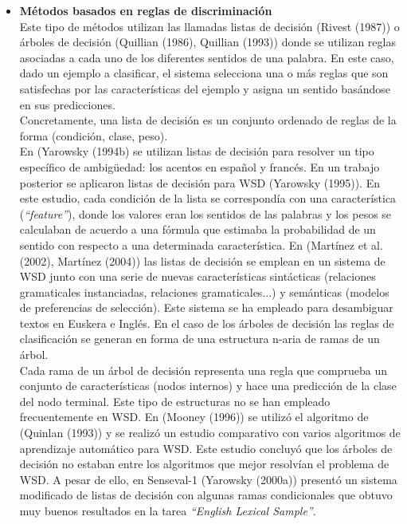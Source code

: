 \begin{itemize}
  \item \textbf{Métodos basados en reglas de discriminación} \\
  Este tipo de métodos utilizan las llamadas listas de decisión (Rivest (1987)) o árboles de decisión (Quillian (1986), Quillian (1993)) donde se utilizan reglas asociadas a cada uno de los diferentes sentidos de una palabra. En este caso, dado un ejemplo a clasificar, el sistema selecciona una o más reglas que son satisfechas por las características del ejemplo y asigna un sentido basándose en sus predicciones.\\
  Concretamente, una lista de decisión es un conjunto ordenado de reglas de la forma (condición, clase, peso).\\
  En (Yarowsky (1994b) se utilizan listas de decisión para resolver un tipo específico de ambigüedad: los acentos en español y francés. En un trabajo posterior se aplicaron listas de decisión para WSD (Yarowsky (1995)). En este estudio, cada condición de la lista se correspondía con una característica (\textit{“feature”}), donde los valores eran los sentidos de las palabras y los pesos se calculaban de acuerdo a una fórmula que estimaba la probabilidad de un sentido con respecto a una determinada característica. En (Martínez et al. (2002), Martínez (2004)) las listas de decisión se emplean en un sistema de WSD junto con una serie de nuevas características sintácticas (relaciones gramaticales instanciadas, relaciones gramaticales...) y semánticas (modelos de preferencias de selección). Este sistema se ha empleado para desambiguar textos en Euskera e Inglés. En el caso de los árboles de decisión las reglas de clasificación se generan en forma de una estructura n-aria de ramas de un árbol. \\
  Cada rama de un árbol de decisión representa una regla que comprueba un conjunto de características (nodos internos) y hace una predicción de la clase del nodo terminal. Este tipo de estructuras no se han empleado frecuentemente en WSD. En (Mooney (1996)) se utilizó el algoritmo de (Quinlan (1993)) y se realizó un estudio comparativo con varios algoritmos de aprendizaje automático para WSD. Este estudio concluyó que los árboles de decisión no estaban entre los algoritmos que mejor resolvían el problema de WSD. A pesar de ello, en Senseval-1 (Yarowsky (2000a)) presentó un sistema modificado de listas de decisión con algunas ramas condicionales que obtuvo muy buenos resultados en la tarea \textit{“English Lexical Sample”}.


\end{itemize}
